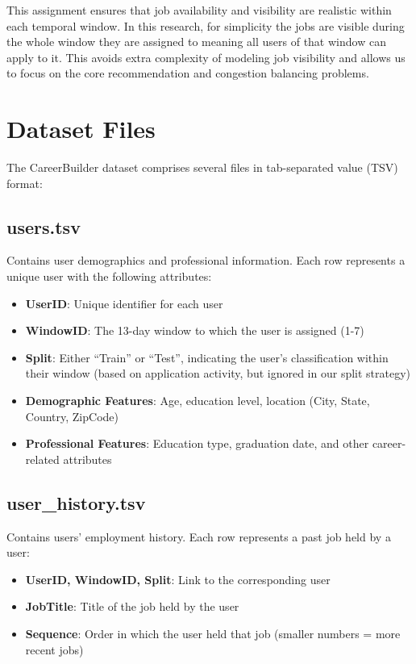 This assignment ensures that job availability and visibility are realistic within each temporal window.
\vspace{1em}
In this research, for simplicity the jobs are visible during the whole window they are assigned to meaning all users of that window can apply to it. This avoids extra complexity of modeling job visibility and allows us to focus on the core recommendation and congestion balancing problems.

\section{Dataset Files}
\label{sec:dataset_files}

The CareerBuilder dataset comprises several files in tab-separated value (TSV) format:

\subsection{users.tsv}

Contains user demographics and professional information. Each row represents a unique user with the following attributes:
\begin{itemize}
    \item \textbf{UserID}: Unique identifier for each user
    \item \textbf{WindowID}: The 13-day window to which the user is assigned (1-7)
    \item \textbf{Split}: Either ``Train'' or ``Test'', indicating the user's classification within their window (based on application activity, but ignored in our split strategy)
    \item \textbf{Demographic Features}: Age, education level, location (City, State, Country, ZipCode)
    \item \textbf{Professional Features}: Education type, graduation date, and other career-related attributes
\end{itemize}

\subsection{user\_history.tsv}

Contains users' employment history. Each row represents a past job held by a user:
\begin{itemize}
    \item \textbf{UserID, WindowID, Split}: Link to the corresponding user
    \item \textbf{JobTitle}: Title of the job held by the user
    \item \textbf{Sequence}: Order in which the user held that job (smaller numbers = more recent jobs)
\end{itemize}

